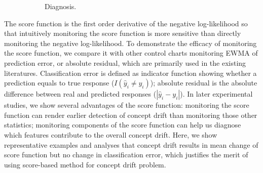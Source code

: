 \documentclass[twoside,11pt]{article}
\begin{document}
\begin{figure}[!htbp]
\begin{subfigure}[t]{0.49\linewidth}
         \caption{Diagnosis.}
         \label{fig:diagnosis}
  \end{subfigure}
  \caption{ }
  \label{fig:proc_mon_score}
\end{figure}

The score function is the first order derivative of the negative log-likelihood so that intuitively monitoring the score function is more sensitive than directly monitoring the negative log-likelihood. To demonstrate the efficacy of monitoring the score function, we compare it with other control charts monitoring EWMA of prediction error, or absolute residual, which are primarily used in the existing literatures. Classification error is defined as indicator function showing whether a prediction equals to true response ($I(\hat {y}_i \neq y_i)$); absolute residual is the absolute difference between real and predicted responses ($|\hat {y}_i - y_i|$). In later experimental studies, we show several advantages of the score function: monitoring the score function can render earlier detection of concept drift than monitoring those other statistics; monitoring components of the score function can help us diagnose which features contribute to the overall concept drift. Here, we show representative examples and analyses that concept drift results in mean change of score function but no change in classification error, which justifies the merit of using score-based method for concept drift problem. 
\end{document}
